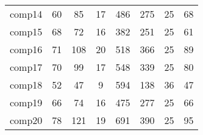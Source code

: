 \begin{table}[h!]
\begin{center}
\begin{tabular}{ |c|c|c|c|c|c|c|c| }
comp14                                    & 60                                         & 85                                       & 17                                     & 486                                          & 275                                       & 25                                       & 68                                        \\
comp15                                    & 68                                         & 72                                       & 16                                     & 382                                          & 251                                       & 25                                       & 61                                        \\
comp16                                    & 71                                         & 108                                      & 20                                     & 518                                          & 366                                       & 25                                       & 89                                        \\
comp17                                    & 70                                         & 99                                       & 17                                     & 548                                          & 339                                       & 25                                       & 80                                        \\
comp18                                    & 52                                         & 47                                       & 9                                      & 594                                          & 138                                       & 36                                       & 47                                        \\
comp19                                    & 66                                         & 74                                       & 16                                     & 475                                          & 277                                       & 25                                       & 66                                        \\
comp20                                    & 78                                         & 121                                      & 19                                     & 691                                          & 390                                       & 25                                       & 95                                        \\

\end{tabular}
\end{center}
\end{table}
